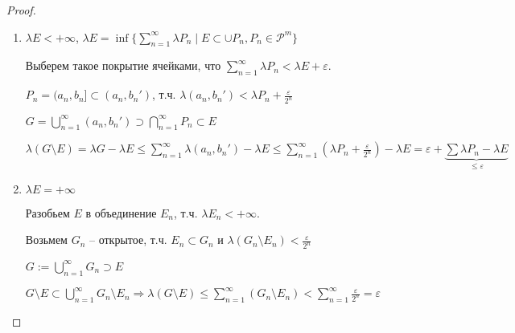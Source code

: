 \begin{proof}
    \begin{enumerate}
        \item $\lambda E < +\infty$, $\lambda E =\inf \{ \sum\limits_{n=1}^\infty \lambda P_n \mid E\subset \cup P_n, P_n\in \mathcal{P}^m\}$
        
        Выберем такое покрытие ячейками, что $\sum\limits_{n=1}^\infty \lambda P_n<\lambda E + \varepsilon$.

        $P_n= (a_n, b_n]\subset (a_n, b_n')$, т.ч. $\lambda (a_n, b_n')< \lambda P_n + \frac{\varepsilon}{2^n}$

        $G=\bigcup\limits_{n=1}^\infty (a_n, b_n')\supset \bigcap\limits_{n=1}^\infty P_n \subset E$

        $\lambda (G\setminus E) = \lambda G - \lambda E \leq \sum\limits_{n=1}^\infty \lambda (a_n, b_n') - \lambda E
        \leq \sum\limits_{n=1}^\infty (\lambda P_n + \frac{\varepsilon}{2^n}) - \lambda E = \varepsilon + \underbrace{\sum \lambda P_n - \lambda E}_{\leq \varepsilon}$

        \item $\lambda E = +\infty$
        
        Разобьем $E$ в объединение $E_n$, т.ч. $\lambda E_n <+\infty$.

        Возьмем $G_n$ – открытое, т.ч. $E_n\subset G_n$ и $\lambda (G_n \setminus E_n) < \frac{\varepsilon}{2^n}$

        $G:= \bigcup\limits_{n=1}^\infty G_n \supset E$

        $G\setminus E \subset \bigcup\limits_{n=1}^\infty G_n \setminus E_n\Rightarrow \lambda (G\setminus E)\leq \sum\limits_{n=1}^\infty(G_n \setminus E_n)< 
        \sum\limits_{n=1}^\infty \frac{\varepsilon}{2^n}=\varepsilon$
    \end{enumerate}
\end{proof}

